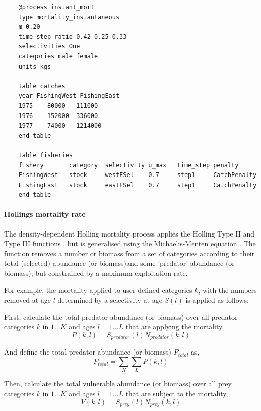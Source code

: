 {\small{\begin{verbatim}
	@process instant_mort
	type mortality_instantaneous
	m 0.20
	time_step_ratio 0.42 0.25 0.33
	selectivities One
	categories male female
	units kgs

	table catches
	year FishingWest FishingEast
	1975	80000	111000
	1976	152000	336000
	1977	74000	1214000
	end table

	table fisheries
	fishery       category  selectivity u_max   time_step penalty
	FishingWest   stock     westFSel    0.7     step1     CatchPenalty
	FishingEast   stock     eastFSel    0.7     step1     CatchPenalty
	end_table
	\end{verbatim}}}

\paragraph{Hollings mortality rate}

The density-dependent Holling mortality process applies the Holling Type II and Type III functions \citep{Holling1959}, but is generalised using the Michaelis-Menten equation \citep{MentenMichaelis1913}. The function removes a number or biomass from a set of categories according to their total (selected) abundance (or biomass)and some 'predator' abundance (or biomass), but constrained by a maximum exploitation rate.

For example, the mortality applied to user-defined categories $k$, with the numbers removed at age $l$ determined by a selectivity-at-age $S(l)$ is applied as follows:

First, calculate the total predator abundance (or biomass) over all predator categories $k$ in $1 \ldots K$ and ages $l = 1 \ldots L$ that are applying the mortality,
\begin{equation}
	P(k,l) = S_{predator}(l) N_{predator}(k,l)
\end{equation}

And define the total predator abundance (or biomass) $P_{total}$ as,
\begin{equation}
	P_{total}  = \sum\limits_K {\sum\limits_L {P(k,l)}} 
\end{equation}

Then, calculate the total vulnerable abundance (or biomass) over all prey categories $k$ in $1 \ldots K$ and ages $l = 1 \ldots L$ that are subject to the mortality,
\begin{equation}
	V(k,l) = S_{prey}(l) N_{prey}(k,l)
\end{equation}

